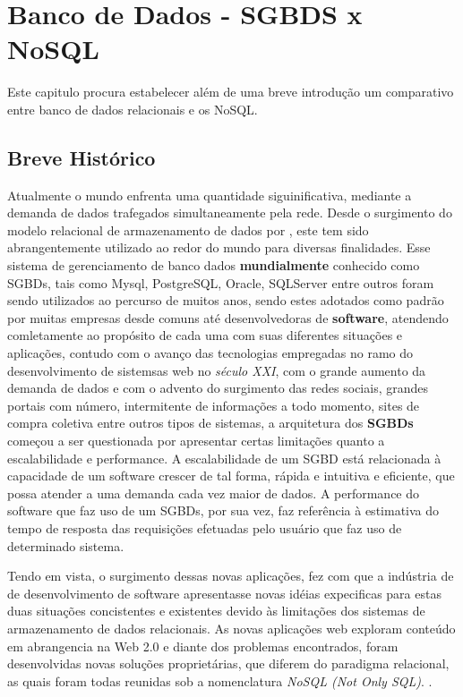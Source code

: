 \chapter{Banco de Dados - SGBDS x NoSQL}
\thispagestyle{empty}
Este capitulo procura estabelecer além de uma breve introdução um comparativo entre banco de dados relacionais e os NoSQL.

\section{Breve Histórico}
Atualmente o mundo enfrenta uma quantidade siguinificativa, mediante a demanda de dados trafegados simultaneamente pela rede. Desde o surgimento do modelo
relacional de armazenamento de dados por \cite{CODD}, este tem sido abrangentemente utilizado ao redor do mundo para diversas finalidades. Esse sistema de 
gerenciamento de banco dados \textbf{mundialmente} conhecido como SGBDs, tais como Mysql, PostgreSQL, Oracle, SQLServer entre outros foram sendo utilizados ao 
percurso de muitos anos, sendo estes adotados como padrão por muitas empresas desde comuns até desenvolvedoras de \textbf{software}, atendendo comletamente ao
propósito de cada uma com suas diferentes situações e aplicações, contudo com o avanço das tecnologias empregadas no ramo do desenvolvimento de sistemsas web 
no \textit{século XXI}, com o grande aumento da demanda de dados e com o advento do surgimento das redes sociais, grandes portais com número, intermitente de
informações a todo momento, sites de compra coletiva entre outros tipos de sistemas, a arquitetura dos \textbf{SGBDs} começou a ser questionada por apresentar 
certas limitações quanto a escalabilidade e performance. A escalabilidade de um SGBD está relacionada à capacidade de um software crescer de tal forma, rápida
e intuitiva e eficiente, que possa atender a uma demanda cada vez maior de dados. A performance do software que faz uso de um SGBDs, por sua vez, faz referência
à estimativa do tempo de resposta das requisições efetuadas pelo usuário que faz uso de determinado sistema.

Tendo em vista, o surgimento dessas novas aplicações, fez com que a indústria de de desenvolvimento de software apresentasse novas idéias expecificas para estas
duas situações concistentes e existentes devido às limitações dos sistemas de armazenamento de dados relacionais. As novas aplicações web exploram conteúdo em 
abrangencia na Web 2.0 e diante dos problemas encontrados, foram desenvolvidas novas soluções proprietárias, que diferem do paradigma relacional, 
as quais foram todas reunidas sob a nomenclatura \textit{NoSQL (Not Only SQL)}. \cite{CUNHA}.


